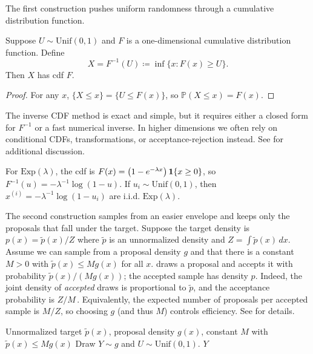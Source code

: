 \label{subsubsec:inverse-cdf}
The first construction pushes uniform randomness through a cumulative distribution function.
\begin{proposition}
Suppose $U \sim \mathrm{Unif}(0,1)$ and $F$ is a one-dimensional cumulative distribution function.
Define
\[
X = F^{-1}(U) \coloneqq \inf\{x : F(x) \ge U\}.
\]
Then $X$ has cdf $F$.
\end{proposition}
\begin{proof}
For any $x$, $\{X \le x\} = \{U \le F(x)\}$, so $\mathbb{P}(X \le x) = F(x)$.
\end{proof}
The inverse CDF method is exact and simple, but it requires either a closed form for $F^{-1}$ or a fast numerical inverse.
In higher dimensions we often rely on conditional CDFs, transformations, or acceptance-rejection instead.
See \citet[\S2.1]{liu_2002_monte_carlo} for additional discussion.

\begin{example}
For $\mathrm{Exp}(\lambda)$, the cdf is
$F(x) = \bigl(1-e^{-\lambda x}\bigr)\,\mathbf{1}\{x \ge 0\}$, so
$F^{-1}(u) = -\lambda^{-1}\log(1-u)$.
If $u_i \sim \mathrm{Unif}(0,1)$, then
$x^{(i)} = -\lambda^{-1}\log(1-u_i)$ are i.i.d. $\mathrm{Exp}(\lambda)$.
\end{example}

\label{subsubsec:rejection-sampling}
The second construction samples from an easier envelope and keeps only the proposals that fall under the target.
Suppose the target density is $p(x) = \tilde p(x)/Z$ where $\tilde p$ is an unnormalized density and $Z = \int \tilde p(x)\,dx$.
Assume we can sample from a proposal density $g$ and that there is a constant $M>0$ with
$\tilde p(x) \le M g(x)$ for all $x$.
 draws a proposal and accepts it with probability
$\tilde p(x)/(M g(x))$; the accepted sample has density $p$.
Indeed, the joint density of \emph{accepted} draws is proportional to $\tilde p$, and the acceptance probability is $Z/M\,.$
Equivalently, the expected number of proposals per accepted sample is $M/Z$, so choosing $g$ (and thus $M$) controls efficiency.
See \citet[\S2.2]{liu_2002_monte_carlo} for details.

\begin{algorithm}[t]
  \caption{Rejection sampling}
  \label{alg:rejection-sampling}
  \begin{algorithmic}[1]
    \Require Unnormalized target $\tilde p(x)$, proposal density $g(x)$, constant $M$ with $\tilde p(x) \le M g(x)$
    \Repeat
      \State Draw $Y \sim g$ and $U \sim \mathrm{Unif}(0,1)$.
    \State \Return $Y$
  \end{algorithmic}
\end{algorithm}

